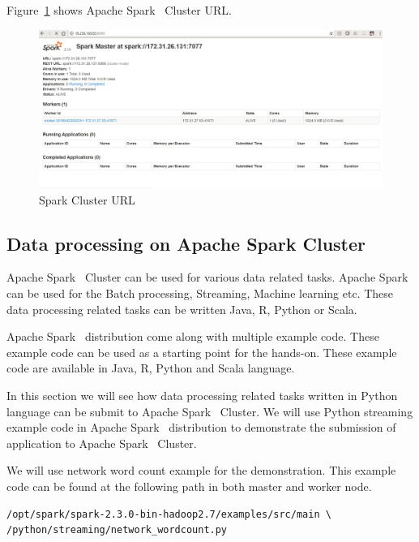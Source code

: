 Figure~\ref{f:spark-cluster-url} shows Apache
Spark~\cite{hid-sp18-511-www-spark} Cluster URL\@.

\begin{figure}[!ht]
\centering\includegraphics[width=\columnwidth]{images/sparkclusterurl.png}
\caption{Spark Cluster URL}\label{f:spark-cluster-url}
\end{figure}

\subsection{Data processing on Apache Spark Cluster}

Apache Spark~\cite{hid-sp18-511-www-spark} Cluster can be used for various data related tasks.
Apache Spark~\cite{hid-sp18-511-www-spark} can be used for the Batch processing, Streaming, Machine learning etc. These data processing related tasks can be written Java, R, Python or Scala. 

Apache Spark~\cite{hid-sp18-511-www-spark} distribution come along with multiple example code. These example code can be used as a starting point for the hands-on. These example code are available in Java, R, Python and Scala language. 

In this section we will see how data processing related tasks written in Python language can be submit to Apache Spark~\cite{hid-sp18-511-www-spark} Cluster. We will use Python streaming example code in Apache Spark~\cite{hid-sp18-511-www-spark} distribution to demonstrate the submission of application to Apache Spark~\cite{hid-sp18-511-www-spark} Cluster.

We will use network word count example for the demonstration. This example code can be found at the following path in both master and worker node.

\begin{verbatim}
/opt/spark/spark-2.3.0-bin-hadoop2.7/examples/src/main \
/python/streaming/network_wordcount.py
\end{verbatim}


